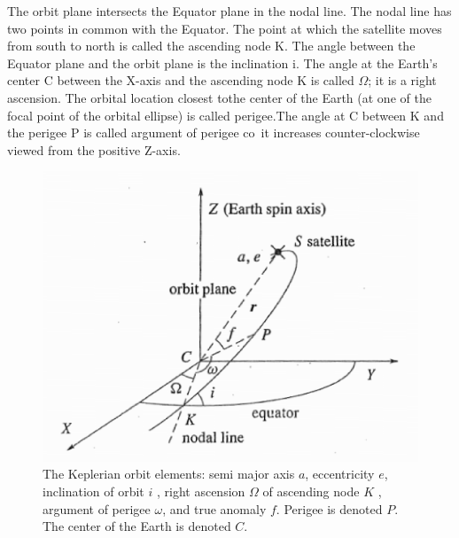 	The orbit plane intersects the Equator plane in the nodal line. The nodal line has two points in common with the Equator. The point at which the satellite moves from south to north is called the ascending node K. The angle between the Equator plane and the orbit plane is the inclination i. The angle at the Earth’s center C between the X-axis and the ascending node K is called $\Omega$; it is a right ascension. The orbital location closest tothe center of the Earth (at one of the focal point of the orbital ellipse) is called perigee.The angle at C between K and the perigee P is called argument of perigee co\ it increases counter-clockwise viewed from the positive Z-axis.
	\begin{figure}
		\centering
		\includegraphics[width=0.7\linewidth]{TeX_files/Part03/chapter09/image/9-7}
		\caption{The Keplerian orbit elements: semi major axis $a$, eccentricity $e$, inclination of orbit $i$ , right ascension $\Omega$ of ascending node $K$ , argument of perigee $\omega$, and true anomaly $f$. Perigee is denoted $P$. The center of the Earth is denoted $C$.}
		\label{fig:9-7}
	\end{figure}

